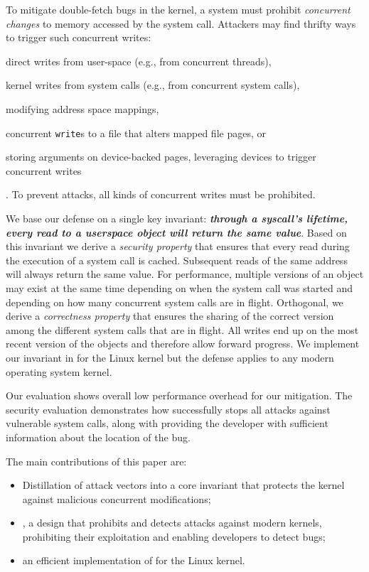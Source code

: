 \documentclass[letterpaper,twocolumn,10pt, anonymous]{article}
\begin{document}
To mitigate double-fetch bugs in the kernel, a system must prohibit
\emph{concurrent changes} to memory accessed by the system call. Attackers may
find thrifty ways to trigger such concurrent writes:
\begin{inparaenum}
\item  direct writes from user-space (e.g., from concurrent threads),
\item  kernel writes from system calls (e.g., from concurrent system calls),
\item  modifying address space mappings,
\item  concurrent \texttt{write}s to a file that alters mapped
file pages, or
\item  storing arguments on device-backed pages, leveraging devices to trigger
concurrent writes
\end{inparaenum}.
To prevent attacks, all kinds of concurrent writes must be prohibited.

We base our defense on a single key invariant: 
\textbf{\emph{through a syscall's lifetime, every read to a userspace object 
will return the same value}}. Based on this invariant we derive a \emph{security
property} that ensures that every read during the execution of a system call is
cached. Subsequent reads of the same address will always return the same value.
For performance, multiple versions of an object may exist at the same time
depending on when the system call was started and depending on how many
concurrent system calls are in flight. Orthogonal, we derive a \emph{correctness
property} that ensures the sharing of the correct version among the different
system calls that are in flight. All writes end up on the most recent version of
the objects and therefore allow forward progress.
We implement our invariant in \tiktok for the Linux kernel but the defense
applies to any modern operating system kernel.

Our evaluation shows overall low performance overhead for our mitigation.
The security evaluation demonstrates how \tiktok successfully stops all attacks
against vulnerable system calls, along with providing the developer with
sufficient information about the location of the bug.


The main contributions of this paper are:

\begin{itemize}
\item Distillation of \tocttou attack vectors into a core invariant that protects
the kernel against malicious concurrent modifications;
\item \tiktok, a design that prohibits and detects
\tocttou attacks against modern kernels, prohibiting their exploitation and
enabling developers to detect \tocttou bugs;
\item an efficient implementation of \tiktok for the Linux kernel.
\end{itemize}
\end{document}
